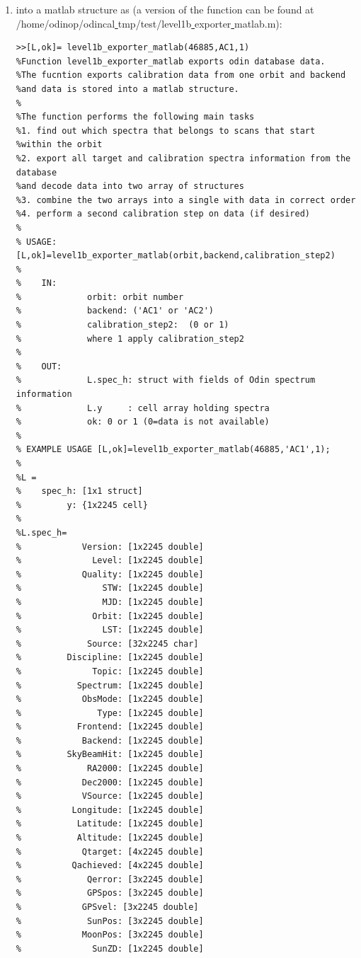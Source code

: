 \documentclass[12pt]{article}
\begin{document}
\begin{enumerate}
\item into a matlab structure as (a version of the function
can be found at 
/home/odinop/odincal\underline{ }tmp/test/level1b\underline{ }exporter\underline{ }matlab.m):
\begin{verbatim}
>>[L,ok]= level1b_exporter_matlab(46885,AC1,1)
%Function level1b_exporter_matlab exports odin database data.
%The fucntion exports calibration data from one orbit and backend 
%and data is stored into a matlab structure.
%
%The function performs the following main tasks
%1. find out which spectra that belongs to scans that start
%within the orbit
%2. export all target and calibration spectra information from the database 
%and decode data into two array of structures
%3. combine the two arrays into a single with data in correct order 
%4. perform a second calibration step on data (if desired)   
%
% USAGE:  [L,ok]=level1b_exporter_matlab(orbit,backend,calibration_step2)
%
%    IN:      
%             orbit: orbit number 
%             backend: ('AC1' or 'AC2')
%             calibration_step2:  (0 or 1)
%             where 1 apply calibration_step2
%
%    OUT:     
%             L.spec_h: struct with fields of Odin spectrum information
%             L.y     : cell array holding spectra
%             ok: 0 or 1 (0=data is not available)
%
% EXAMPLE USAGE [L,ok]=level1b_exporter_matlab(46885,'AC1',1);        
%                
%L = 
%    spec_h: [1x1 struct]
%         y: {1x2245 cell}       
%
%L.spec_h=
%            Version: [1x2245 double]
%              Level: [1x2245 double]
%            Quality: [1x2245 double]
%                STW: [1x2245 double]
%                MJD: [1x2245 double]
%              Orbit: [1x2245 double]
%                LST: [1x2245 double]
%             Source: [32x2245 char]
%         Discipline: [1x2245 double]
%              Topic: [1x2245 double]
%           Spectrum: [1x2245 double]
%            ObsMode: [1x2245 double]
%               Type: [1x2245 double]
%           Frontend: [1x2245 double]
%            Backend: [1x2245 double]
%         SkyBeamHit: [1x2245 double]
%             RA2000: [1x2245 double]
%            Dec2000: [1x2245 double]
%            VSource: [1x2245 double]
%          Longitude: [1x2245 double]
%           Latitude: [1x2245 double]
%           Altitude: [1x2245 double]
%            Qtarget: [4x2245 double]
%          Qachieved: [4x2245 double]
%             Qerror: [3x2245 double]
%             GPSpos: [3x2245 double]
%            GPSvel: [3x2245 double]
%             SunPos: [3x2245 double]
%            MoonPos: [3x2245 double]
%              SunZD: [1x2245 double]

\end{verbatim}
\end{enumerate}
\end{document}
